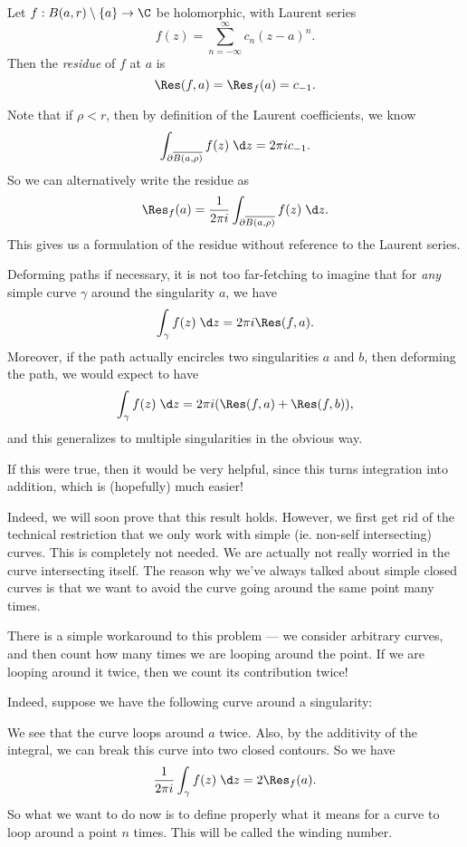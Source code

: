 \documentclass[a4paper]{article}
\begin{document}
\begin{defi}[Residue]
  Let $f: B (a, r) \setminus \{a\} \to \C$ be holomorphic, with Laurent series
  \[
    f(z) = \sum_{n = -\infty}^\infty c_n (z - a)^n.
  \]
  Then the \emph{residue} of $f$ at $a$ is
  \[
    \Res(f, a) = \Res_f(a) = c_{-1}.
  \]
\end{defi}
Note that if $\rho < r$, then by definition of the Laurent coefficients, we know
\[
  \int_{\partial \overline{B(a, \rho)}} f(z)\;\d z = 2\pi i c_{-1}.
\]
So we can alternatively write the residue as
\[
  \Res_f(a) = \frac{1}{2 \pi i}\int_{\partial \overline{B(a, \rho)}} f(z)\;\d z.
\]
This gives us a formulation of the residue without reference to the Laurent series.

Deforming paths if necessary, it is not too far-fetching to imagine that for \emph{any} simple curve $\gamma$ around the singularity $a$, we have
\[
  \int_{\gamma} f(z)\;\d z = 2\pi i\Res(f, a).
\]
Moreover, if the path actually encircles two singularities $a$ and $b$, then deforming the path, we would expect to have
\[
  \int_{\gamma} f(z)\;\d z = 2\pi i(\Res(f, a) + \Res(f, b)),
\]
and this generalizes to multiple singularities in the obvious way.

If this were true, then it would be very helpful, since this turns integration into addition, which is (hopefully) much easier!

Indeed, we will soon prove that this result holds. However, we first get rid of the technical restriction that we only work with simple (ie. non-self intersecting) curves. This is completely not needed. We are actually not really worried in the curve intersecting itself. The reason why we've always talked about simple closed curves is that we want to avoid the curve going around the same point many times.

There is a simple workaround to this problem --- we consider arbitrary curves, and then count how many times we are looping around the point. If we are looping around it twice, then we count its contribution twice!

Indeed, suppose we have the following curve around a singularity:
\begin{center}
\end{center}
We see that the curve loops around $a$ twice. Also, by the additivity of the integral, we can break this curve into two closed contours. So we have
\[
  \frac{1}{2\pi i} \int_\gamma f(z)\;\d z = 2 \Res_f(a).
\]
So what we want to do now is to define properly what it means for a curve to loop around a point $n$ times. This will be called the winding number.
\end{document}
